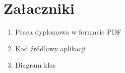 \section{Załaczniki}
\begin{enumerate}[leftmargin=*]
    \item Praca dyplomowa w formacie PDF
    \item Kod źródłowy aplikacji
    \item Diagram klas
\end{enumerate}